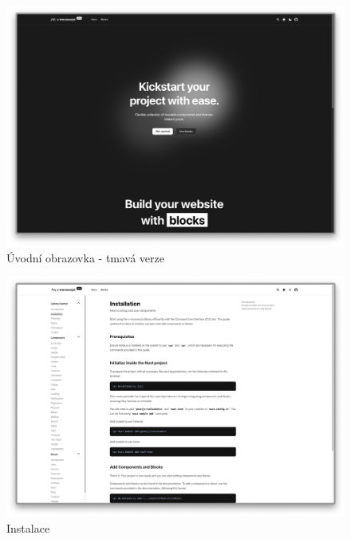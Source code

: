 \begin{figure}[h]
  \includegraphics[width=\textwidth]{images/landing-page-dark}
  \caption{Úvodní obrazovka - tmavá verze} \label{picture:documentation:landing-page-dark}
\end{figure}

\begin{figure}[h]
  \includegraphics[width=\textwidth]{images/installation}
  \caption{Instalace} \label{picture:documentation:installation}
\end{figure}

